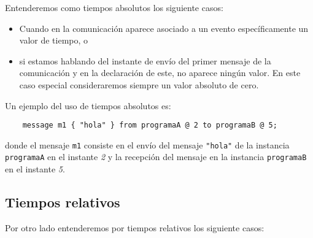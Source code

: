 Entenderemos como tiempos absolutos los siguiente casos:

\begin{itemize}
\item Cuando en la comunicación aparece asociado a un evento
  específicamente un valor de tiempo, o
\item si estamos hablando del instante de envío del primer mensaje de
  la comunicación y en la declaración de este, no aparece ningún valor. En
  este caso especial consideraremos siempre un valor absoluto de cero.
\end{itemize}

Un ejemplo del uso de tiempos absolutos es:

\begin{lstlisting}
    message m1 { "hola" } from programaA @ 2 to programaB @ 5;
\end{lstlisting}

\noindent donde el mensaje \lstinline{m1} consiste en el envío del mensaje
\lstinline{"hola"} de la instancia \lstinline{programaA} en el
instante \textit{2} y la recepción del mensaje en la instancia
\lstinline{programaB} en el instante \textit{5}.

\subsection{Tiempos relativos}

Por otro lado entenderemos por tiempos relativos los siguiente casos:

